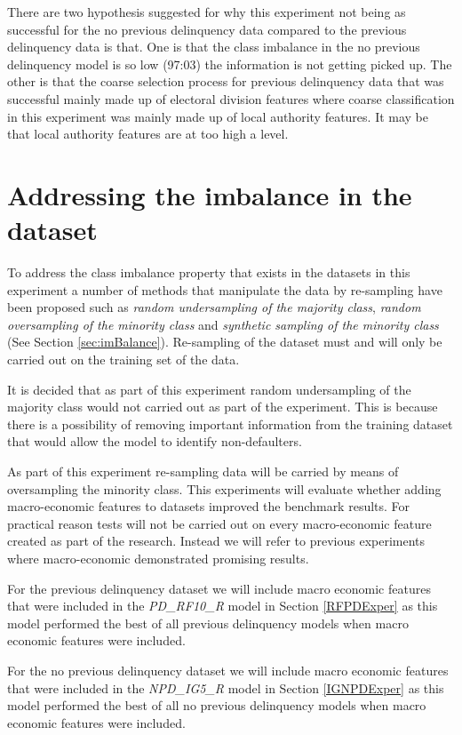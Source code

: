 There are two hypothesis suggested for why this experiment not being as successful for the no previous delinquency data compared to the previous delinquency data is that. One is that the class imbalance in the no previous delinquency model is so low (97:03) the information is not getting picked up. The other is that the coarse selection process for previous delinquency data that was successful mainly made up of electoral division features where coarse classification in this experiment was mainly made up of local authority features. It may be that local authority features are at too high a level. 

\section{Addressing the imbalance in the dataset}
To address the class imbalance property that exists in the datasets in this experiment a number of methods that manipulate the data by re-sampling have been proposed such as \textit{random undersampling of the majority class}, \textit{random oversampling of the minority class} and \textit{synthetic sampling of the minority class} (See Section \ref{sec:imBalance}). Re-sampling of the dataset must and will only be carried out on the training set of the data.

It is decided that as part of this experiment random undersampling of the majority class would not carried out as part of the experiment. This is because there is a possibility of removing important information from the training dataset that would allow the model to identify non-defaulters.

As part of this experiment re-sampling data will be carried by means of oversampling the minority class. This experiments will evaluate whether adding macro-economic features to datasets improved the benchmark results. For practical reason tests will not be carried out on every macro-economic feature created as part of the research. Instead we will refer to previous experiments where macro-economic demonstrated promising results. 

For the previous delinquency dataset we will include macro economic features that were included in the \textit{PD\_RF10\_R} model in Section \ref{RFPDExper} as this model performed the best of all previous delinquency models when macro economic features were included.

For the no previous delinquency dataset we will include macro economic features that were included in the \textit{NPD\_IG5\_R} model in Section \ref{IGNPDExper} as this model performed the best of all no previous delinquency models when macro economic features were included. 

